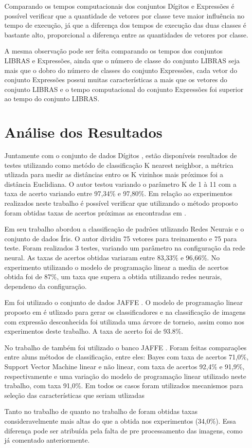 Comparando os tempos computacionais dos conjuntos Dígitos e Expressões é possível verificar que a quantidade de vetores por classe teve maior influência no tempo de execução, já que a diferença dos tempos de execução das duas classes é bastante alto, proporcional a diferença entre as quantidades de vetores por classe. 

A mesma observação pode ser feita comparando os tempos dos conjuntos LIBRAS e Expressões, ainda que o número de classe do conjunto LIBRAS seja mais que o dobro do número de classes do conjunto Expressões, cada vetor do conjunto Expressões possui muitas características a mais que os vetores do conjunto LIBRAS e o tempo computacional do conjunto Expressões foi superior ao tempo do conjunto LIBRAS.

\section{Análise dos Resultados}

Juntamente com o conjunto de dados Dígitos \cite{Digitos}, estão disponíveis resultados de testes utilizando como metódo de classificação K nearest neighbor, a métrica utlizada para medir as distâncias entro os K vizinhos mais próximos foi a distância Euclidiana. O autor testou variando o parâmetro K de 1 à 11 com a taxa de acerto variando entre 97,34\% e 97,80\%. Em relação ao experimentos realizados neste trabalho é possível verificar que utilizando o método proposto foram obtidas taxas de acertos próximas as encontradas em .

Em seu trabalho  abordou a classificação de padrões utlizando Redes Neurais e o conjunto de dados Íris. O autor dividiu 75 vetores para treinamento e 75 para teste. Foram realizados 3 testes, variando um parâmetro na configuração da rede neural. As taxas de acertos obtidas variaram entre 83,33\% e 96,66\%. No experimento utilizando o modelo de programação linear a media de acertos obtida foi de 87\%, um taxa que supera a obtida utilizando redes neurais, dependeno da configuração.

Em  foi utilizado o conjunto de dados JAFFE \cite{Jaffe}. O modelo de programação linear proposto em  é utlizado para gerar os classificadores e na classificação de imagens com expressão desconhecida foi utilizada uma árvore de torneio, assim como nos experimentos deste trabalho. A taxa de acerto foi de 93.8\%.

No trabalho de  também foi utilizado o banco JAFFE \cite{Jaffe}. Foram feitas comparações entre aluns métodos de classificação, entre eles: Bayes com taxa de acertos 71,0\%, Support Vector Machine linear e não linear, com taxa de acertos 92,4\% e 91,9\%, respectivamente e uma variação do modelo de programação linear utilizado neste trabalho, com taxa 91,0\%. Em todos os casos foram utilizados mecanismos para seleção das características que seriam utlizadas
 
Tanto no trabalho de  quanto no trabalho de  foram obtidas taxas consideravelmente mais altas do que a obtida nos experimentos (34,0\%). Essa diferença pode ser atribuída pela falta de pre processamento das imagens, como já comentado anteriormente.
